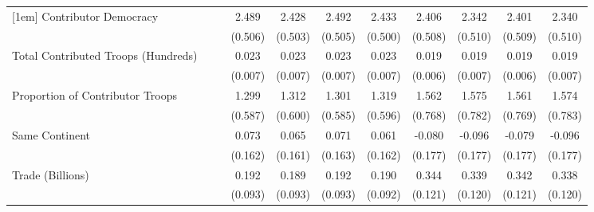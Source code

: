 \begin{table}[htbp]
\begin{tabular}{l*{10}{c}}
[1em]
Contributor Democracy&                    &                    &       2.489\sym{**}&       2.428\sym{**}&       2.492\sym{**}&       2.433\sym{**}&       2.406\sym{**}&       2.342\sym{**}&       2.401\sym{**}&       2.340\sym{**}\\
                    &                    &                    &     (0.506)        &     (0.503)        &     (0.505)        &     (0.500)        &     (0.508)        &     (0.510)        &     (0.509)        &     (0.510)        \\
[1em]
Total Contributed Troops (Hundreds)&                    &                    &       0.023\sym{**}&       0.023\sym{**}&       0.023\sym{**}&       0.023\sym{**}&       0.019\sym{**}&       0.019\sym{**}&       0.019\sym{**}&       0.019\sym{**}\\
                    &                    &                    &     (0.007)        &     (0.007)        &     (0.007)        &     (0.007)        &     (0.006)        &     (0.007)        &     (0.006)        &     (0.007)        \\
[1em]
Proportion of Contributor Troops&                    &                    &       1.299\sym{*} &       1.312\sym{*} &       1.301\sym{*} &       1.319\sym{*} &       1.562\sym{*} &       1.575\sym{*} &       1.561\sym{*} &       1.574\sym{*} \\
                    &                    &                    &     (0.587)        &     (0.600)        &     (0.585)        &     (0.596)        &     (0.768)        &     (0.782)        &     (0.769)        &     (0.783)        \\
[1em]
Same Continent      &                    &                    &       0.073        &       0.065        &       0.071        &       0.061        &      -0.080        &      -0.096        &      -0.079        &      -0.096        \\
                    &                    &                    &     (0.162)        &     (0.161)        &     (0.163)        &     (0.162)        &     (0.177)        &     (0.177)        &     (0.177)        &     (0.177)        \\
[1em]
Trade (Billions)    &                    &                    &       0.192\sym{*} &       0.189\sym{*} &       0.192\sym{*} &       0.190\sym{*} &       0.344\sym{**}&       0.339\sym{**}&       0.342\sym{**}&       0.338\sym{**}\\
                    &                    &                    &     (0.093)        &     (0.093)        &     (0.093)        &     (0.092)        &     (0.121)        &     (0.120)        &     (0.121)        &     (0.120)        \\

\end{tabular}
\end{table}
